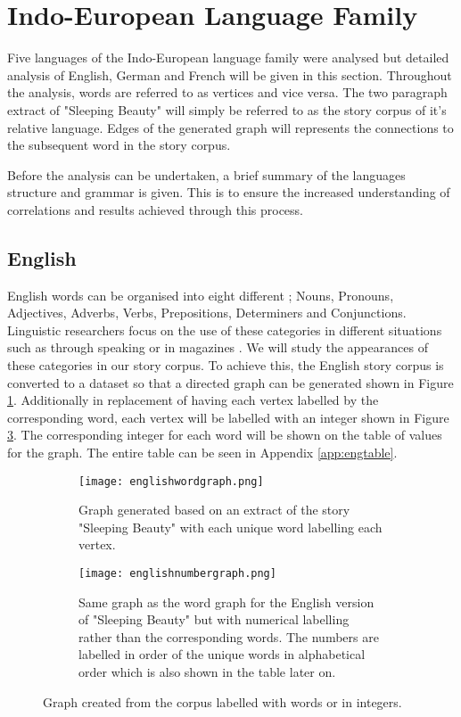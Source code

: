 \section{Indo-European Language Family}
Five languages of the Indo-European language family were analysed but detailed analysis of English, German and French will be given in this section. Throughout the analysis, words are referred to as vertices and vice versa. The two paragraph extract of "Sleeping Beauty" will simply be referred to as the story corpus of it's relative language. Edges of the generated graph will represents the connections to the subsequent word in the story corpus. 

Before the analysis can be undertaken, a brief summary of the languages structure and grammar is given. This is to ensure the increased understanding of correlations and results achieved through this process.

\subsection{English}
English words can be organised into eight different ; Nouns, Pronouns, Adjectives, Adverbs, Verbs, Prepositions, Determiners and Conjunctions. Linguistic researchers focus on the use of these categories in different situations such as through speaking or in magazines \cite{khaisaeng2017study}. We will study the appearances of these categories in our story corpus. To achieve this, the English story corpus is converted to a dataset so that a directed graph can be generated shown in Figure \ref{fig:engword}. Additionally in replacement of having each vertex labelled by the corresponding word, each vertex will be labelled with an integer shown in Figure \ref{fig:engnum}. The corresponding integer for each word will be shown on the table of values for the graph. The entire table can be seen in Appendix \ref{app:engtable}.

\begin{figure}[H]
\centering
\begin{subfigure}{.45\textwidth}
	\texttt{[image: englishwordgraph.png]}
	\caption{Graph generated based on an extract of the story "Sleeping Beauty" with each unique word labelling each vertex.}
	\label{fig:engword}
\end{subfigure}
\hfill
\begin{subfigure}{.45\textwidth}
	\texttt{[image: englishnumbergraph.png]}
	\caption{Same graph as the word graph for the English version of "Sleeping Beauty" but with numerical labelling rather than the corresponding words. The numbers are labelled in order of the unique words in alphabetical order which is also shown in the table later on.}
	\label{fig:engnum}
\end{subfigure}
\caption{Graph created from the corpus labelled with words or in integers.}
\end{figure}

